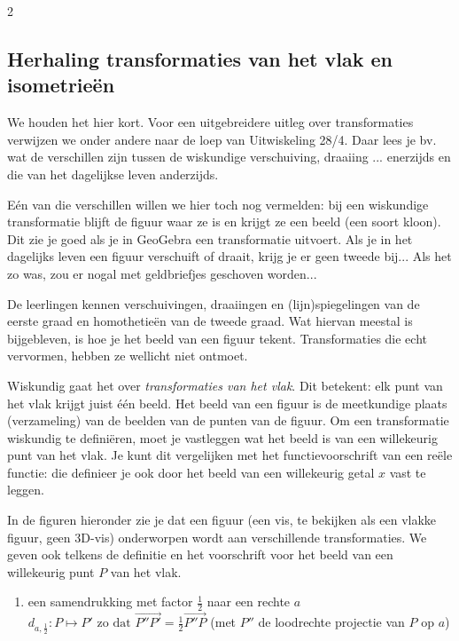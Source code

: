 \begin{multicols}{2}
	\subsection{Herhaling transformaties van het vlak en isometrieën}
	
	We houden het hier kort. Voor een uitgebreidere uitleg over transformaties verwijzen we onder andere naar de loep van Uitwiskeling 28/4. Daar lees je bv. wat de verschillen zijn tussen de wiskundige verschuiving, draaiing ... enerzijds en die van het dagelijkse leven anderzijds.
 
 Eén van die verschillen willen we hier toch nog vermelden: bij een wiskundige transformatie blijft de figuur waar ze is en krijgt ze een beeld (een soort kloon). Dit zie je goed als je in GeoGebra een transformatie uitvoert. Als je in het dagelijks leven een figuur verschuift of draait, krijg je er geen tweede bij... Als het zo was, zou er nogal met geldbriefjes geschoven worden...
	
	De leerlingen kennen verschuivingen, draaiingen en (lijn)spiegelingen van de eerste graad en homothetieën van de tweede graad. Wat hiervan meestal is bijgebleven, is hoe je het beeld van een figuur tekent. Transformaties die echt vervormen, hebben ze wellicht niet ontmoet.
	
	Wiskundig gaat het over \emph{transformaties van het vlak}. Dit betekent: elk punt van het vlak krijgt juist één beeld. Het beeld van een figuur is de meetkundige plaats (verzameling) van de beelden van de punten van de figuur. Om een transformatie wiskundig te definiëren, moet je vastleggen wat het beeld is van een willekeurig punt van het vlak. Je kunt dit vergelijken met het functievoorschrift van een reële functie: die definieer je ook door het beeld van een willekeurig getal $x$ vast te leggen.
	
	In de figuren hieronder zie je dat een figuur (een vis, te bekijken als een vlakke figuur, geen 3D-vis) onderworpen wordt aan verschillende transformaties. We geven ook telkens de definitie en het voorschrift voor het beeld van een willekeurig punt $P$ van het vlak.
	
	\begin{enumerate}
		    \item een samendrukking met factor $\frac{1}{2}$ naar een rechte $a$ \\
  $d_{a,\frac{1}{2}}: P\mapsto P' \text{ zo dat }\overrightarrow{P''P'}=\frac{1}{2}\overrightarrow{P''P}$ (met $P''$ de loodrechte projectie van $P$ op $a$)    
	    	

\end{enumerate}
\end{multicols}
